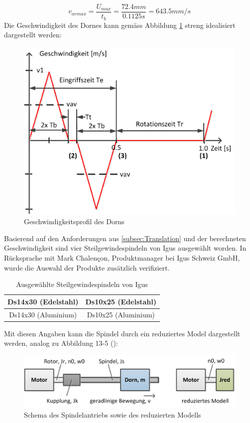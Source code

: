 \begin{equation}
v_{avmax}=\frac{U_{max}}{t_{b}}=\frac{72.4mm}{0.1125s}=643.5mm/s
\end{equation}
\newpage
Die Geschwindigkeit des Dornes kann  gemäss Abbildung \ref{fig:vprofil_dorn} streng idealisiert dargestellt werden:
	\begin{figure}[H]
	\includegraphics[width=1\textwidth]{Illustrationen/6-Umsetzung/vprofil_dorn.png}
	\caption{Geschwindigkeitsprofil des Dorns}
	\label{fig:vprofil_dorn}
\end{figure}
Basierend auf den Anforderungen aus \ref{subsec:Translation} und der berechneten Geschwindigkeit sind vier Steilgewindespindeln von Igus ausgewählt worden. In Rücksprache mit Mark Chalençon, Produktmanager bei Igus Schweiz GmbH, wurde die Auswahl der Produkte zusätzlich verifiziert. 
\begin{table}[H]
\begin{tabular}{|c|c|}
	\hline 
	Ds14x30 (Edelstahl) & Ds10x25 (Edelstahl) \\ 
	\hline 
	Ds14x30 (Aluminium) & Ds10x25 (Aluminium) \\ 
	\hline 
\end{tabular} 
\caption{Ausgewählte Steilgewindespindeln von Igus}
\label{tab:spindeln}
\end{table}
Mit diesen Angaben kann die Spindel durch ein reduziertes Model dargestellt werden, analog zu Abbildung 13-5 ():
 	\begin{figure}[H]
 	\includegraphics[width=1\textwidth]{Illustrationen/6-Umsetzung/red_modell.png}
 	\caption{Schema des Spindelantriebs sowie des reduzierten Modells}
 	\label{fig:red_modell}
	\end{figure}

